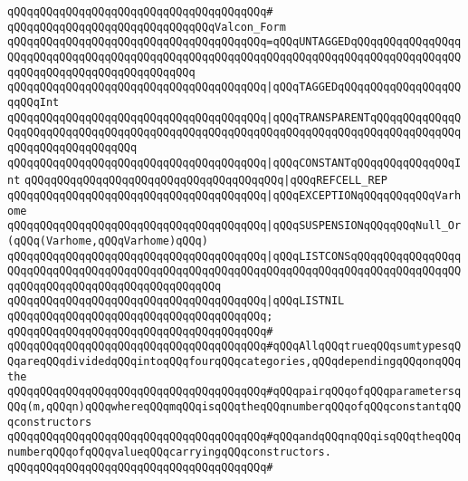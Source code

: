 \verb|qQQqqQQqqQQqqQQqqQQqqQQqqQQqqQQqqQQqqQQq#|\newline
\newline
\verb|qQQqqQQqqQQqqQQqqQQqqQQqqQQqqQQqValcon_Form|\newline
\verb|qQQqqQQqqQQqqQQqqQQqqQQqqQQqqQQqqQQqqQQq=qQQqUNTAGGEDqQQqqQQqqQQqqQQqqQQqqQQqqQQqqQQqqQQqqQQqqQQqqQQqqQQqqQQqqQQqqQQqqQQqqQQqqQQqqQQqqQQqqQQqqQQqqQQqqQQqqQQqqQQqqQQqqQQq|\newline
\verb|qQQqqQQqqQQqqQQqqQQqqQQqqQQqqQQqqQQqqQQq|\verb#|qQQqTAGGEDqQQqqQQqqQQqqQQqqQQqqQQqInt#\newline
\verb|qQQqqQQqqQQqqQQqqQQqqQQqqQQqqQQqqQQqqQQq|\verb#|qQQqTRANSPARENTqQQqqQQqqQQqqQQqqQQqqQQqqQQqqQQqqQQqqQQqqQQqqQQqqQQqqQQqqQQqqQQqqQQqqQQqqQQqqQQqqQQqqQQqqQQqqQQqqQQqqQQq#\newline
\verb|qQQqqQQqqQQqqQQqqQQqqQQqqQQqqQQqqQQqqQQq|\verb#|qQQqCONSTANTqQQqqQQqqQQqqQQqInt#\newline
\verb|qQQqqQQqqQQqqQQqqQQqqQQqqQQqqQQqqQQqqQQq|\verb#|qQQqREFCELL_REP#\newline
\verb|qQQqqQQqqQQqqQQqqQQqqQQqqQQqqQQqqQQqqQQq|\verb#|qQQqEXCEPTIONqQQqqQQqqQQqVarhome#\newline
\verb|qQQqqQQqqQQqqQQqqQQqqQQqqQQqqQQqqQQqqQQq|\verb#|qQQqSUSPENSIONqQQqqQQqNull_Or(qQQq(Varhome,qQQqVarhome)qQQq)#\newline
\verb|qQQqqQQqqQQqqQQqqQQqqQQqqQQqqQQqqQQqqQQq|\verb#|qQQqLISTCONSqQQqqQQqqQQqqQQqqQQqqQQqqQQqqQQqqQQqqQQqqQQqqQQqqQQqqQQqqQQqqQQqqQQqqQQqqQQqqQQqqQQqqQQqqQQqqQQqqQQqqQQqqQQqqQQqqQQqqQQq#\newline
\verb|qQQqqQQqqQQqqQQqqQQqqQQqqQQqqQQqqQQqqQQq|\verb#|qQQqLISTNIL#\newline
\verb|qQQqqQQqqQQqqQQqqQQqqQQqqQQqqQQqqQQqqQQq;|\newline
\verb|qQQqqQQqqQQqqQQqqQQqqQQqqQQqqQQqqQQqqQQq#|\newline
\verb|qQQqqQQqqQQqqQQqqQQqqQQqqQQqqQQqqQQqqQQq#qQQqAllqQQqtrueqQQqsumtypesqQQqareqQQqdividedqQQqintoqQQqfourqQQqcategories,qQQqdependingqQQqonqQQqthe|\newline
\verb|qQQqqQQqqQQqqQQqqQQqqQQqqQQqqQQqqQQqqQQq#qQQqpairqQQqofqQQqparametersqQQq(m,qQQqn)qQQqwhereqQQqmqQQqisqQQqtheqQQqnumberqQQqofqQQqconstantqQQqconstructors|\newline
\verb|qQQqqQQqqQQqqQQqqQQqqQQqqQQqqQQqqQQqqQQq#qQQqandqQQqnqQQqisqQQqtheqQQqnumberqQQqofqQQqvalueqQQqcarryingqQQqconstructors.|\newline
\verb|qQQqqQQqqQQqqQQqqQQqqQQqqQQqqQQqqQQqqQQq#|\newline
